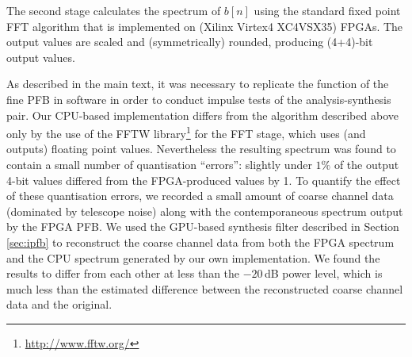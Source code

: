 \documentclass{pasa}%
\begin{document}
\begin{appendix}
\begin{figure}[t!]
    \label{fig:pre_fft_distributions}
\end{figure}

The second stage calculates the spectrum of $b[n]$ using the standard fixed point FFT algorithm that is implemented on (Xilinx Virtex4 XC4VSX35) FPGAs.
The output values are scaled and (symmetrically) rounded, producing (4+4)-bit output values.

As described in the main text, it was necessary to replicate the function of the fine PFB in software in order to conduct impulse tests of the analysis-synthesis pair.
Our CPU-based implementation differs from the algorithm described above only by the use of the FFTW library\footnote{\url{http://www.fftw.org/}} for the FFT stage, which uses (and outputs) floating point values.
Nevertheless the resulting spectrum was found to contain a small number of quantisation ``errors'': slightly under $1\%$ of the output 4-bit values differed from the FPGA-produced values by 1.
To quantify the effect of these quantisation errors, we recorded a small amount of coarse channel data (dominated by telescope noise) along with the contemporaneous spectrum output by the FPGA PFB.
We used the GPU-based synthesis filter described in Section \ref{sec:ipfb} to reconstruct the coarse channel data from both the FPGA spectrum and the CPU spectrum generated by our own implementation.
We found the results to differ from each other at less than the $-20\,$dB power level, which is much less than the estimated difference between the reconstructed coarse channel data and the original.

\end{appendix}



\end{document}
